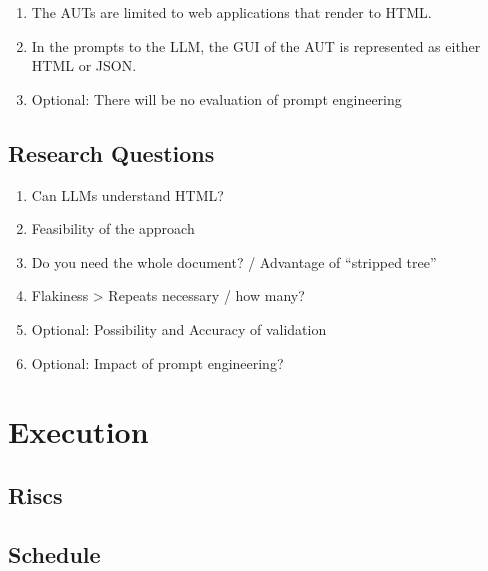 \begin{enumerate}
    \item The AUTs are limited to web applications that render to HTML.
    \item In the prompts to the LLM, the GUI of the AUT is represented as either HTML or JSON.
    \item Optional: There will be no evaluation of prompt engineering  
\end{enumerate}

\section{Research Questions}

\begin{enumerate}
    \item Can LLMs understand HTML?
    \item Feasibility of the approach
    \item Do you need the whole document? / Advantage of “stripped tree”
    \item Flakiness > Repeats necessary / how many?
    \item Optional: Possibility and Accuracy of validation
    \item Optional: Impact of prompt engineering?
\end{enumerate}

\chapter{Execution}

\section{Riscs}

\section{Schedule}

